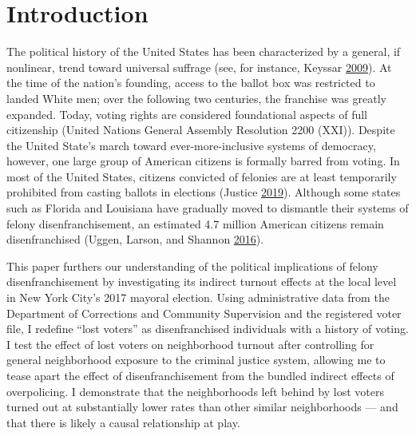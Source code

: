 \documentclass[
  12pt,
]{article}
\begin{document}
\hypertarget{introduction}{%
\section*{Introduction}\label{introduction}}

The political history of the United States has been characterized by a general, if nonlinear, trend toward universal suffrage (see, for instance, Keyssar \protect\hyperlink{ref-Keyssar2009}{2009}). At the time of the nation's founding, access to the ballot box was restricted to landed White men; over the following two centuries, the franchise was greatly expanded. Today, voting rights are considered foundational aspects of full citizenship (United Nations General Assembly Resolution 2200 (XXI)). Despite the United State's march toward ever-more-inclusive systems of democracy, however, one large group of American citizens is formally barred from voting. In most of the United States, citizens convicted of felonies are at least temporarily prohibited from casting ballots in elections (Justice \protect\hyperlink{ref-bcj_laws}{2019}). Although some states such as Florida and Louisiana have gradually moved to dismantle their systems of felony disenfranchisement, an estimated 4.7 million American citizens remain disenfranchised (Uggen, Larson, and Shannon \protect\hyperlink{ref-sentencing_2016}{2016}).

This paper furthers our understanding of the political implications of felony disenfranchisement by investigating its indirect turnout effects at the local level in New York City's 2017 mayoral election. Using administrative data from the Department of Corrections and Community Supervision and the registered voter file, I redefine ``lost voters'' as disenfranchised individuals with a history of voting. I test the effect of lost voters on neighborhood turnout after controlling for general neighborhood exposure to the criminal justice system, allowing me to tease apart the effect of disenfranchisement from the bundled indirect effects of overpolicing. I demonstrate that the neighborhoods left behind by lost voters turned out at substantially lower rates than other similar neighborhoods --- and that there is likely a causal relationship at play.
\end{document}
